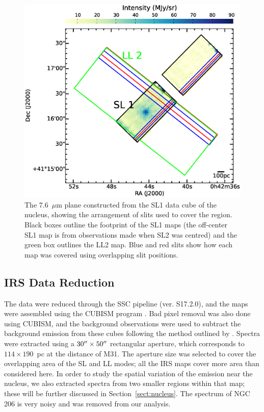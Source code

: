 \documentclass[useAMS,usenatbib,a4paper]{mn2e}
\begin{document}
\begin{figure}
\centering
\includegraphics[scale=0.3]{./fig3.eps}
\caption{The 7.6~$\mu$m plane constructed from the SL1 data cube of the nucleus, showing the arrangement of slits used to cover the region. 
Black boxes outline the footprint of the SL1 maps (the off-center SL1 map is from observations made
when SL2 was centred) and the green box outlines the LL2 map. 
Blue and red slits show how  each map was covered using overlapping slit positions.
\label{slits}
}
\end{figure}

\subsection{IRS Data Reduction}
\label{sect:irs_data}

The data were reduced through the SSC pipeline (ver. S17.2.0), and the maps were assembled using the CUBISM program \citep{Smith:2007fk}. 
Bad pixel removal was also done using CUBISM, and the background observations were used to subtract the background emission from these cubes 
following the method outlined by \citet{Gordon:2008lr}. Spectra were extracted using a $30\hbox{$^{\prime\prime}$}\times50\hbox{$^{\prime\prime}$}$   rectangular aperture,
which corresponds to $114\times190$~pc at the distance of M31.
The aperture size was selected to cover the overlapping area of the SL and LL modes; all the IRS maps cover more area than  considered here.
In order to study the spatial variation of the emission near the nucleus, we also extracted spectra from two smaller regions
within that map; these will be further discussed in Section~\ref{sect:nucleus}.
The spectrum of NGC 206 is very noisy and was removed from our analysis. 
\end{document}
